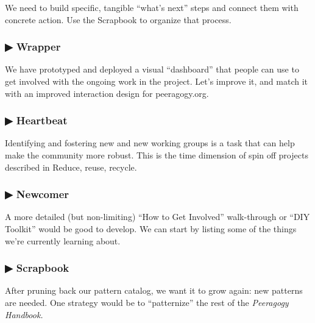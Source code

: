 We need to build specific, tangible ``what's next'' steps and connect
them with concrete action. Use the Scrapbook to organize that process.

\hypertarget{wrapper}{%
\subsubsection{▶ Wrapper}\label{wrapper}}

We have prototyped and deployed a visual ``dashboard'' that people can
use to get involved with the ongoing work in the project. Let's improve
it, and match it with an improved interaction design for peeragogy.org.

\hypertarget{heartbeat}{%
\subsubsection{▶ Heartbeat}\label{heartbeat}}

Identifying and fostering new and new working groups is a task that can
help make the community more robust. This is the time dimension of spin
off projects described in Reduce, reuse, recycle.

\hypertarget{newcomer}{%
\subsubsection{▶ Newcomer}\label{newcomer}}

A more detailed (but non-limiting) ``How to Get Involved'' walk-through
or ``DIY Toolkit'' would be good to develop. We can start by listing
some of the things we're currently learning about.

\hypertarget{scrapbook}{%
\subsubsection{▶ Scrapbook}\label{scrapbook}}

After pruning back our pattern catalog, we want it to grow again: new
patterns are needed. One strategy would be to ``patternize'' the rest of
the \emph{Peeragogy Handbook.}
